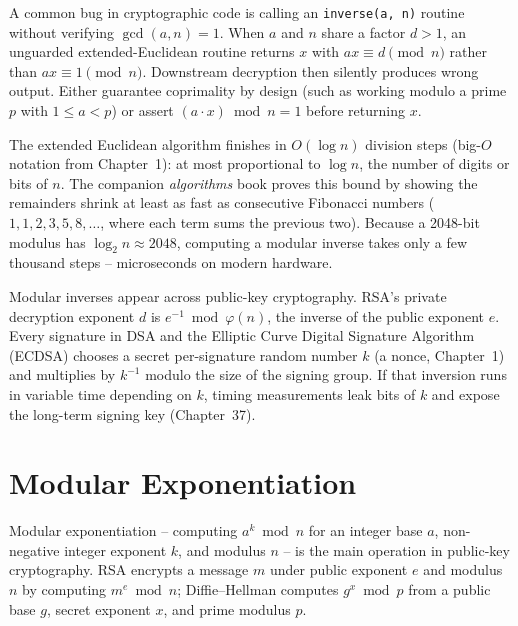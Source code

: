 \begin{trapbox}
A common bug in cryptographic code is calling an \texttt{inverse(a, n)} routine without verifying $\gcd(a,n)=1$. When $a$ and $n$ share a factor $d > 1$, an unguarded extended-Euclidean routine returns $x$ with $ax \equiv d \pmod{n}$ rather than $ax \equiv 1 \pmod{n}$. Downstream decryption then silently produces wrong output. Either guarantee coprimality by design (such as working modulo a prime $p$ with $1 \le a < p$) or assert $(a \cdot x) \bmod n = 1$ before returning $x$.
\end{trapbox}

\begin{connectionbox}
The extended Euclidean algorithm finishes in $O(\log n)$ division steps (big-$O$ notation from Chapter~1): at most proportional to $\log n$, the number of digits or bits of $n$. The companion \emph{algorithms} book proves this bound by showing the remainders shrink at least as fast as consecutive Fibonacci numbers ($1, 1, 2, 3, 5, 8, \dots$, where each term sums the previous two). Because a 2048-bit modulus has $\log_2 n \approx 2048$, computing a modular inverse takes only a few thousand steps -- microseconds on modern hardware.
\end{connectionbox}

\begin{applicationbox}
Modular inverses appear across public-key cryptography. RSA's private decryption exponent $d$ is $e^{-1} \bmod \varphi(n)$, the inverse of the public exponent $e$. Every signature in DSA and the Elliptic Curve Digital Signature Algorithm (ECDSA) chooses a secret per-signature random number $k$ (a nonce, Chapter~1) and multiplies by $k^{-1}$ modulo the size of the signing group. If that inversion runs in variable time depending on $k$, timing measurements leak bits of $k$ and expose the long-term signing key (Chapter~37).
\end{applicationbox}

\section{Modular Exponentiation}

Modular exponentiation -- computing $a^k \bmod n$ for an integer base $a$, non-negative integer exponent $k$, and modulus $n$ -- is the main operation in public-key cryptography. RSA encrypts a message $m$ under public exponent $e$ and modulus $n$ by computing $m^e \bmod n$; Diffie--Hellman computes $g^x \bmod p$ from a public base $g$, secret exponent $x$, and prime modulus $p$.

